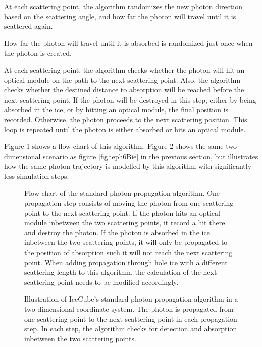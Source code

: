 At each scattering point, the algorithm randomizes the new photon direction based on the scattering angle, and how far the photon will travel until it is scattered again.

How far the photon will travel until it is absorbed is randomized just once when the photon is created.

At each scattering point, the algorithm checks whether the photon will hit an optical module on the path to the next scattering point. Also, the algorithm checks whether the destined distance to absorption will be reached before the next scattering point. If the photon will be destroyed in this step, either by being absorbed in the ice, or by hitting an optical module, the final position is recorded. Otherwise, the photon proceeds to the next scattering position. This loop is repeated until the photon is either absorbed or hits an optical module. \cite{ppcpaper}


Figure \ref{fig:Ar0vai8u} shows a flow chart of this algorithm. Figure \ref{fig:oheeL3ai} shows the same two-dimensional scenario as figure \ref{fig:ieph6Bie} in the previous section, but illustrates how the same photon trajectory is modelled by this algorithm with significantly less simulation steps.

\begin{figure}[htb]
  \label{fig:Ar0vai8u}
  \caption{Flow chart of the standard photon propagation algorithm. One propagation step consists of moving the photon from one scattering point to the next scattering point. If the photon hits an optical module inbetween the two scattering points, it record a hit there and destroy the photon. If the photon is absorbed in the ice inbetween the two scattering points, it will only be propagated to the position of absorption such it will not reach the next scattering point. When adding propagation through hole ice with a different scattering length to this algorithm, the calculation of the next scattering point needs to be modified accordingly.}
\end{figure}

\begin{figure}[htb]
  \label{fig:oheeL3ai}
  \caption{Illustration of IceCube's standard photon propagation algorithm in a two-dimensional coordinate system. The photon is propagated from one scattering point to the next scattering point in each propagation step. In each step, the algorithm checks for detection and absorption inbetween the two scattering points.}
\end{figure}

